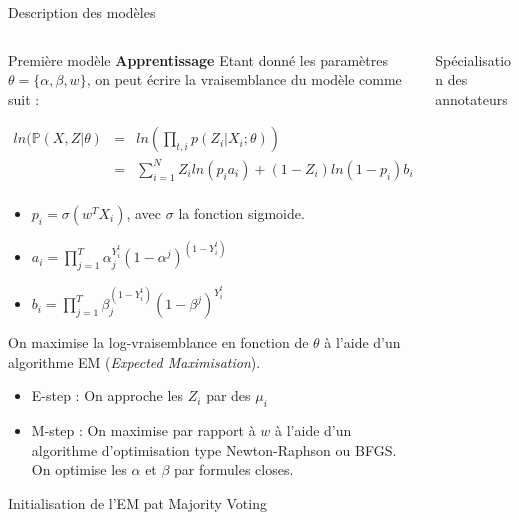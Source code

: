 \documentclass[final]{beamer}
\newlength{\onecolwid}
\newlength{\twocolwid}
\begin{document}
\begin{frame}[t]
\begin{columns}[t]
\begin{column}{\twocolwid}
\begin{block}{Description des modèles}
\begin{columns}[t,totalwidth=\twocolwid]
\begin{column}{\onecolwid}
\begin{alertblock}{Première modèle}
\textbf{Apprentissage}
Etant donné les paramètres $\theta=\{\alpha, \beta, w\}$, on peut écrire la vraisemblance du modèle comme suit :

\[\begin{array}{lll}
ln(\mathbb{P}(X,Z|\theta) &=& ln(\displaystyle \prod_{t,i} p(Z_i|X_i; \theta)) \\
& = &\displaystyle \sum_{i=1}^N Z_i ln(p_i a_i) + (1-Z_i) ln(1-p_i) b_i \\
\end{array}
\]

\begin{itemize}
    \item $ p_i = \sigma(w^T X_i) $, avec $\sigma$ la fonction sigmoide.
    \item $ a_i = \displaystyle \prod_{j=1}^T \alpha_j^{Y_i^t} (1-\alpha^j)^{(1-Y_i^t)} $
    \item $ b_i = \displaystyle \prod_{j=1}^T \beta_j^{(1-Y_i^t)} (1-\beta^j)^{Y_i^t} $

\end{itemize}
On maximise la log-vraisemblance en fonction de $\theta$ à l'aide d'un algorithme EM (\textit{Expected Maximisation}).
\begin{itemize}
    \item E-step : On approche les $Z_i$ par des $\mu_i$
    \item M-step : On maximise par rapport à $w$ à l'aide d'un algorithme d'optimisation type Newton-Raphson ou BFGS. On optimise les $\alpha$ et $\beta$ par formules closes.
\end{itemize}
Initialisation de l'EM pat Majority Voting
\end{alertblock}


\end{column} %

\begin{column}{\onecolwid} %


\begin{alertblock}{Spécialisation des annotateurs}


\end{alertblock}
\end{column}
\end{columns}
\end{block}
\end{column}
\end{columns}
\end{frame}
\end{document}
